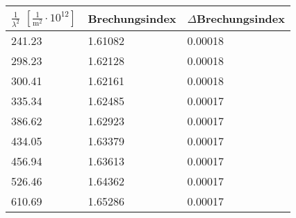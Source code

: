 \documentclass[a4paper,12pt]{article}
\numberwithin{equation}{section}
\begin{document}

\begin{tabular}{lll}
        $\tfrac{1}{\lambda ^2}$ $\left[\tfrac{1}{\text{m}^2}\cdot 10^{12}\right]$ & Brechungsindex & $\Delta $Brechungsindex \\
        \hline
        241.23 & 1.61082 & 0.00018 \\
        298.23 & 1.62128 & 0.00018 \\
        300.41 & 1.62161 & 0.00018 \\
        335.34 & 1.62485 & 0.00017 \\
        386.62 & 1.62923 & 0.00017 \\
        434.05 & 1.63379 & 0.00017 \\
        456.94 & 1.63613 & 0.00017 \\
        526.46 & 1.64362 & 0.00017 \\
        610.69 & 1.65286 & 0.00017 
\end{tabular}

\end{document}

